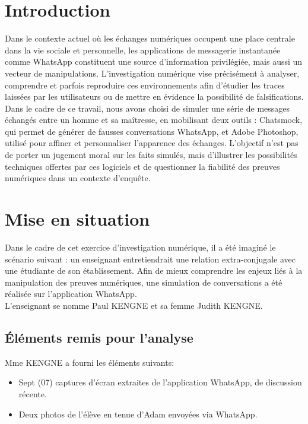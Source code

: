 \documentclass[12pt, a4paper]{article}
\begin{document}
\section*{Introduction}
Dans le contexte actuel où les échanges numériques occupent une place centrale dans la vie sociale et personnelle, les applications de messagerie instantanée comme WhatsApp constituent une source d’information privilégiée, mais aussi un vecteur de manipulations. L’investigation numérique vise précisément à analyser, comprendre et parfois reproduire ces environnements afin d’étudier les traces laissées par les utilisateurs ou de mettre en évidence la possibilité de falsifications.
Dans le cadre de ce travail, nous avons choisi de simuler une série de messages échangés entre un homme et sa maîtresse, en mobilisant deux outils : Chatsmock, qui permet de générer de fausses conversations WhatsApp, et Adobe Photoshop, utilisé pour affiner et personnaliser l’apparence des échanges. L’objectif n’est pas de porter un jugement moral sur les faits simulés, mais d’illustrer les possibilités techniques offertes par ces logiciels et de questionner la fiabilité des preuves numériques dans un contexte d’enquête.
\newpage
\section{Mise en situation}
Dans le cadre de cet exercice d’investigation numérique, il a été imaginé le scénario suivant : un enseignant entretiendrait une relation extra-conjugale avec une étudiante de son établissement. Afin de mieux comprendre les enjeux liés à la manipulation des preuves numériques, une simulation de conversations a été réalisée sur l’application WhatsApp. \\

L'enseignant se nomme Paul KENGNE et sa femme Judith KENGNE.

\subsection{Éléments remis pour l'analyse}
Mme KENGNE a fourni les éléments suivants:
\begin{itemize}
	\item Sept (07) captures d’écran extraites de l’application WhatsApp, de discussion récente.
	\item Deux photos de l’élève en tenue d’Adam envoyées via WhatsApp.
\end{itemize}
\end{document}
